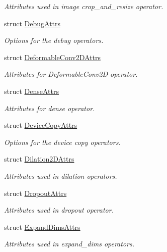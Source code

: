 \begin{DoxyCompactItemize}
\begin{DoxyCompactList}\small\item\em Attributes used in image crop\+\_\+and\+\_\+resize operator. \end{DoxyCompactList}\item 
struct \hyperlink{structtvm_1_1relay_1_1DebugAttrs}{Debug\+Attrs}
\begin{DoxyCompactList}\small\item\em Options for the debug operators. \end{DoxyCompactList}\item 
struct \hyperlink{structtvm_1_1relay_1_1DeformableConv2DAttrs}{Deformable\+Conv2\+D\+Attrs}
\begin{DoxyCompactList}\small\item\em Attributes for Deformable\+Conv2D operator. \end{DoxyCompactList}\item 
struct \hyperlink{structtvm_1_1relay_1_1DenseAttrs}{Dense\+Attrs}
\begin{DoxyCompactList}\small\item\em Attributes for dense operator. \end{DoxyCompactList}\item 
struct \hyperlink{structtvm_1_1relay_1_1DeviceCopyAttrs}{Device\+Copy\+Attrs}
\begin{DoxyCompactList}\small\item\em Options for the device copy operators. \end{DoxyCompactList}\item 
struct \hyperlink{structtvm_1_1relay_1_1Dilation2DAttrs}{Dilation2\+D\+Attrs}
\begin{DoxyCompactList}\small\item\em Attributes used in dilation operators. \end{DoxyCompactList}\item 
struct \hyperlink{structtvm_1_1relay_1_1DropoutAttrs}{Dropout\+Attrs}
\begin{DoxyCompactList}\small\item\em Attributes used in dropout operator. \end{DoxyCompactList}\item 
struct \hyperlink{structtvm_1_1relay_1_1ExpandDimsAttrs}{Expand\+Dims\+Attrs}
\begin{DoxyCompactList}\small\item\em Attributes used in expand\+\_\+dims operators. \end{DoxyCompactList}\item 

\end{DoxyCompactItemize}
